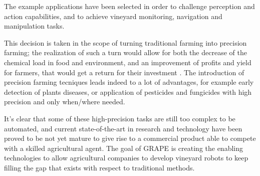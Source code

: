 The example applications have been selected in order to challenge perception and action capabilities, and to achieve vineyard monitoring, navigation and manipulation tasks. 
\par This decision is taken in the scope of turning traditional farming into precision farming; the realization of such a turn would allow for both the decrease of the chemical load in food and environment, and an improvement of profits and yield for farmers, that would get a return for their investment \parencite{precisionFarming}. The introduction of precision farming tecniques leads indeed to a lot of advantages, for example early detection of plants diseases, or application of pesticides and fungicides with high precision and only when/where needed.

It's clear that some of these high-precision tasks are still too complex to be automated, and current state-of-the-art in research and technology have been proved to be not yet mature to give rise to a commercial product able to compete with a skilled agricultural agent. The goal of \ac{GRAPE} is creating the enabling technologies to allow agricultural companies to develop vineyard robots to keep filling the gap that exists with respect to traditional methods.

